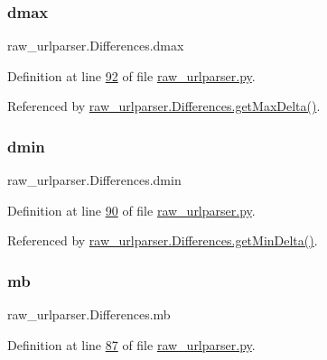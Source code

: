 \subsubsection{\texorpdfstring{dmax}{dmax}}
{\footnotesize\ttfamily raw\+\_\+urlparser.\+Differences.\+dmax}



Definition at line \hyperlink{raw__urlparser_8py_source_l00092}{92} of file \hyperlink{raw__urlparser_8py_source}{raw\+\_\+urlparser.\+py}.



Referenced by \hyperlink{raw__urlparser_8py_source_l00097}{raw\+\_\+urlparser.\+Differences.\+get\+Max\+Delta()}.

\mbox{\label{classraw__urlparser_1_1_differences_af8457a8e542de086595e7fbbffdf713c}} 
\subsubsection{\texorpdfstring{dmin}{dmin}}
{\footnotesize\ttfamily raw\+\_\+urlparser.\+Differences.\+dmin}



Definition at line \hyperlink{raw__urlparser_8py_source_l00090}{90} of file \hyperlink{raw__urlparser_8py_source}{raw\+\_\+urlparser.\+py}.



Referenced by \hyperlink{raw__urlparser_8py_source_l00094}{raw\+\_\+urlparser.\+Differences.\+get\+Min\+Delta()}.

\mbox{\label{classraw__urlparser_1_1_differences_ab4c3073b8c569b7791ab3b8e21e9b364}} 
\subsubsection{\texorpdfstring{mb}{mb}}
{\footnotesize\ttfamily raw\+\_\+urlparser.\+Differences.\+mb}



Definition at line \hyperlink{raw__urlparser_8py_source_l00087}{87} of file \hyperlink{raw__urlparser_8py_source}{raw\+\_\+urlparser.\+py}.

